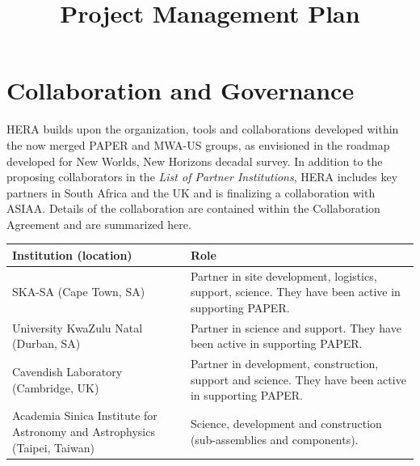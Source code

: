 \documentclass[preprint]{aastex}
\begin{document}
\title{Project Management Plan}


\section{Collaboration and Governance}
HERA builds upon the organization, tools and collaborations developed within the now
merged PAPER and MWA-US groups, as envisioned in the roadmap developed for New
Worlds, New Horizons decadal survey. In addition to the proposing collaborators in
the {\em List of Partner Institutions}, HERA includes key partners in South Africa
and the UK and is finalizing a collaboration with ASIAA.  Details of the collaboration are 
contained within the Collaboration Agreement and are summarized here.
\begin{table}[h]
\begin{tabular}{| p{} | p{} |}\hline
\textbf{Institution (location)} & \textbf{Role} \\ \hline
SKA-SA (Cape Town, SA) & Partner in site development, logistics, support, science. They have been active in supporting PAPER.\\ \hline
University KwaZulu Natal (Durban, SA) & Partner in science and support. They have been active in supporting PAPER.\\ \hline
Cavendish Laboratory (Cambridge, UK) & Partner in development, construction, support and science.  They have been active in supporting PAPER. \\ \hline
Academia Sinica Institute for Astronomy and Astrophysics (Taipei, Taiwan) & Science, development and construction (sub-assemblies and components). \\ \hline
\end{tabular}
\label{tab:otherpartners}
\end{table}
\end{document}
